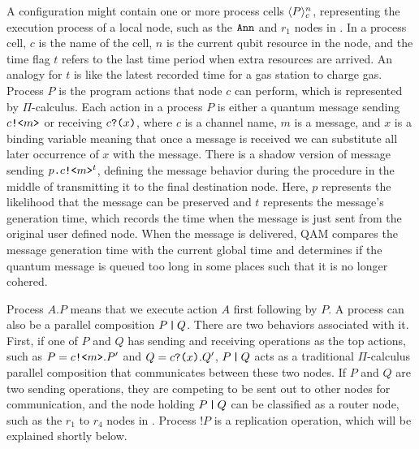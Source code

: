 A configuration might contain one or more process cells $\langle P \rangle^{n}_{c}$, representing the execution process of a local node,
such as the $\texttt{Ann}$ and $r_1$ nodes in .
In a process cell, $c$ is the name of the cell, $n$ is the current qubit resource in the node,
and the time flag $t$ refers to the last time period when extra resources are arrived.
An analogy for $t$ is like the latest recorded time for a gas station to charge gas.
Process $P$ is the program actions that node $c$ can perform, which is represented by $\Pi$-calculus.
Each action in a process $P$ is either a quantum message sending $c\texttt{!<}m\texttt{>}$ or receiving $c\texttt{?(}x\texttt{)}$,
where $c$ is a channel name, $m$ is a message, and $x$ is a binding variable 
meaning that once a message is received we can substitute all later occurrence of $x$ with the message.
There is a shadow version of message sending $p\texttt{.}c\texttt{!<}m\texttt{>}^t$,
defining the message behavior during the procedure in the middle of transmitting it to the final destination node.
Here, $p$ represents the likelihood that the message can be preserved and $t$ represents the message's generation time,
which records the time when the message is just sent from the original user defined node.
When the message is delivered, QAM compares the message generation time with the current global time
and determines if the quantum message is queued too long in some places such that it is no longer cohered.

Process $A.P$ means that we execute action $A$ first following by $P$.
A process can also be a parallel composition $P\,\texttt{|}\,Q$. There are two behaviors associated with it.
First, if one of $P$ and $Q$ has sending and receiving operations as the top actions, 
such as $P=c\texttt{!<}m\texttt{>}.P'$ and $Q=c\texttt{?(}x\texttt{)}.Q'$, $P\,\texttt{|}\,Q$ acts as a traditional $\Pi$-calculus parallel composition that communicates between these two nodes. If $P$ and $Q$ are two sending operations, they are competing to be sent out to other nodes for communication, and the node holding $P\,\texttt{|}\,Q$ can be classified as a router node, such as the $r_1$ to $r_4$ nodes in .
Process $!P$ is a replication operation, which will be explained shortly below.

